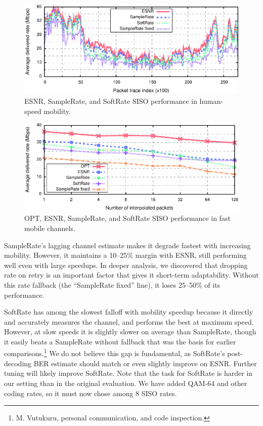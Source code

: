 \begin{figure}[t]
      \centering
      \includegraphics[width=\textwidth]{figures/rate/siso_rate_time_opt_eff_sr_so.pdf}
      \caption{\label{fig:siso_rate_time_opt_eff_sr_so} ESNR, SampleRate, and SoftRate SISO performance in human-speed mobility.}
\end{figure}
\begin{figure}[h]
      \centering
      \includegraphics[width=\textwidth]{figures/rate/siso_rate_skip_opt_eff_sr_so.pdf}
      \caption{\label{fig:siso_rate_skip_opt_eff_sr_so} OPT, ESNR, SampleRate, and SoftRate SISO performance in fast mobile channels.}
\end{figure}


SampleRate's lagging channel estimate makes it degrade fastest with increasing mobility. However, it maintains a 10--25\% margin with ESNR, still performing well even with large speedups. In deeper analysis, we discovered that dropping rate on retry is an important factor that gives it short-term adaptability. Without this rate fallback (the ``SampleRate fixed'' line), it loses 25--50\% of its performance.

SoftRate has among the slowest falloff with mobility speedup because it directly and accurately measures the channel, and performs the best at maximum speed. However, at slow speeds it is slightly slower on average than SampleRate, though it easily beats a SampleRate without fallback that was the basis for earlier comparisons.\footnote{M. Vutukuru, personal communication, and code inspection.}
We do not believe this gap is fundamental, as SoftRate's post-decoding BER estimate should match or even slightly improve on ESNR\@. Further tuning will likely improve SoftRate. Note that the task for SoftRate is harder in our setting than in the original evaluation. We have added QAM-64 and other coding rates, so it must now chose among 8 SISO rates.

